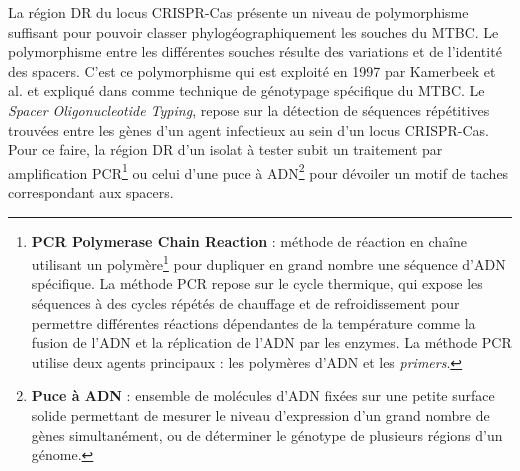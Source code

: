 \documentclass[twoside,a4paper,11pt,frenchb,openany]{report}
\begin{document}
La région DR du locus CRISPR-Cas présente un niveau de polymorphisme suffisant pour pouvoir classer phylogéographiquement les souches du MTBC. Le polymorphisme entre les différentes souches résulte des variations et de l'identité des spacers. C'est ce polymorphisme qui est exploité en 1997 par Kamerbeek et al. et expliqué dans \cite{kamerbeek} comme technique de génotypage spécifique du MTBC. Le \textit{Spacer Oligonucleotide Typing}, repose sur la détection de séquences répétitives trouvées entre les gènes d'un agent infectieux au sein d'un locus CRISPR-Cas. Pour ce faire, la région DR d'un isolat à tester subit un traitement par amplification PCR\footnote{\textbf{PCR Polymerase Chain Reaction} : méthode de réaction en chaîne utilisant un polymère\footnote{\textbf{Polymère} : macromolécule répétant un même motif structural.} pour dupliquer en grand nombre une séquence d'ADN spécifique. La méthode PCR repose sur le cycle thermique, qui expose les séquences à des cycles répétés de chauffage et de refroidissement pour permettre différentes réactions dépendantes de la température comme la fusion de l'ADN et la réplication de l'ADN par les enzymes. La méthode PCR utilise deux agents principaux : les polymères d'ADN et les \textit{primers}.} ou celui d'une puce à ADN\footnote{\textbf{Puce à ADN} : ensemble de molécules d'ADN fixées sur une petite surface solide permettant de mesurer le niveau d'expression d'un grand nombre de gènes simultanément, ou de déterminer le génotype de plusieurs régions d'un génome.} pour dévoiler un motif de taches correspondant aux spacers. 
\end{document}
